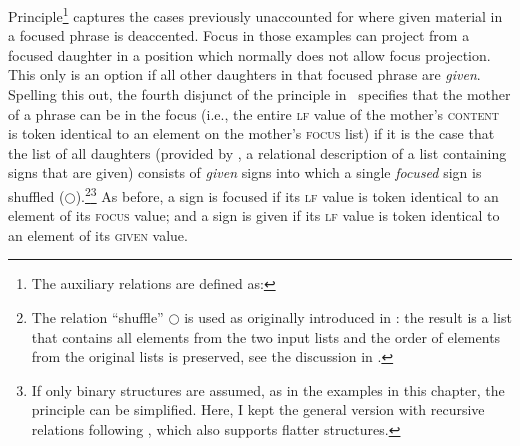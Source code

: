 \documentclass[output=paper,biblatex,babelshorthands,newtxmath,draftmode,colorlinks,citecolor=brown]{langscibook}
\begin{document}
Principle\footnote{The auxiliary relations are defined
  as:
\ea
{}
\zlast} 
captures the cases previously unaccounted for where given material in a
focused phrase is deaccented. Focus in those examples can project from a
focused daughter in a position which normally does not allow focus
projection.  This only is an option if all other daughters in that
focused phrase are \emph{given}.  Spelling this out, the fourth
disjunct of the principle in~
specifies that the mother of a phrase can be in the focus (i.e., the
entire \textsc{lf} value of the mother's \textsc{content} is token
identical to an element on the mother's \textsc{focus} list) if it is
the case that the list of all daughters (provided by , a relational description of a list containing signs that are given)
consists of \textit{given} signs into which a single \textit{focused}
sign is shuffled ($\bigcirc$).\footnote{The relation ``shuffle'' $\bigcirc$ is used as originally introduced in : the result is a list that contains all elements from the two input lists and the order of elements from the original lists is preserved, see the discussion in .}\footnote{If only binary structures are
  assumed, as in the examples in this chapter, the principle can be
  simplified. Here, I kept the general version with recursive
  relations following \citet{dKM2003a}, which also
  supports flatter structures.} As before, a sign is focused if its
\textsc{lf} value is token identical to an element of its
\textsc{focus} value; and a sign is given if its \textsc{lf} value is
token identical to an element of its \textsc{given} value.
\end{document}
